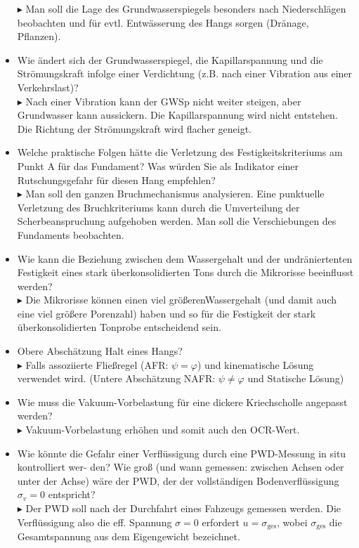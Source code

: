 \documentclass[fleqn,twoside]{article}
\begin{document}
\begin{itemize}
$\blacktriangleright$ Man soll die Lage des Grundwasserspiegels besonders nach Niederschlägen beobachten
und für evtl. Entwässerung des Hangs sorgen (Dränage, Pflanzen).
\item Wie ändert sich der Grundwasserspiegel, die Kapillarspannung und die Strömungskraft infolge
einer Verdichtung (z.B. nach einer Vibration aus einer Verkehrslast)?\\
$\blacktriangleright$ Nach einer Vibration kann der GWSp nicht weiter steigen, aber Grundwasser kann
aussickern. Die Kapillarspannung wird nicht entstehen. Die Richtung der Strömungskraft wird flacher
geneigt.
\item Welche praktische Folgen hätte die Verletzung des Festigkeitskriteriums am Punkt A für das
Fundament? Was würden Sie als Indikator einer Rutschungsgefahr für diesen Hang empfehlen?\\
$\blacktriangleright$ Man soll den ganzen Bruchmechanismus analysieren. Eine punktuelle Verletzung
des Bruchkriteriums kann durch die Umverteilung der Scherbeanspruchung aufgehoben werden.
Man soll die Verschiebungen des Fundaments beobachten.
\item Wie kann die Beziehung zwischen dem Wassergehalt und der undräniertenten
Festigkeit eines stark überkonsolidierten Tons durch die Mikrorisse beeinflusst werden?\\
$\blacktriangleright$ Die Mikrorisse können einen viel größerenWassergehalt (und damit auch eine viel größere Porenzahl)
haben und so für die Festigkeit der stark überkonsolidierten Tonprobe entscheidend sein.
\item Obere Abschätzung Halt eines Hangs?\\
$\blacktriangleright$ Falls assoziierte Fließregel (AFR: $\psi = \varphi$) und kinematische Lösung verwendet wird. (Untere Abschätzung NAFR: $\psi\neq\varphi$ und Statische Lösung)
\item Wie muss die Vakuum-Vorbelastung für eine dickere Kriechscholle angepasst werden?\\
$\blacktriangleright$ Vakuum-Vorbelastung erhöhen und somit auch den OCR-Wert.
\item Wie könnte die Gefahr einer Verflüssigung durch eine PWD-Messung in situ kontrolliert wer- den? Wie groß (und wann gemessen: zwischen Achsen oder unter der Achse) wäre der PWD, der der vollständigen Bodenverflüssigung $\sigma_v = 0$ entspricht?\\
$\blacktriangleright$ Der PWD soll nach der Durchfahrt eines Fahzeugs gemessen werden. Die Verflüssigung also die eff. Spannung $\sigma = 0$ erfordert $u = \sigma_{\text{ges}}$, wobei $\sigma_{\text{ges}}$ die Gesamtspannung aus dem Eigengewicht bezeichnet.
\end{itemize}
\end{document}
